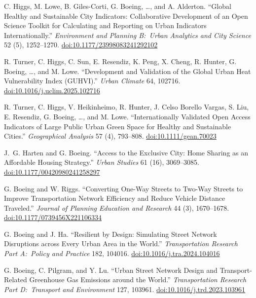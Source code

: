 \documentclass[11pt,letterpaper]{report} %
\begin{document}
\begin{tablist}
\item[2025] \tab{}C. Higgs, M. Lowe, B. Giles-Corti, G. Boeing, \ldots, and A. Alderton. \enquote{Global Healthy and Sustainable City Indicators: Collaborative Development of an Open Science Toolkit for Calculating and Reporting on Urban Indicators Internationally.} \textit{Environment and Planning B:\ Urban Analytics and City Science} 52 (5), 1252--1270. \href{https://doi.org/10.1177/23998083241292102}{doi:10.1177/23998083241292102}

\item[2025] \tab{}R. Turner, C. Higgs, C. Sun, E. Resendiz, K. Peng, X. Cheng, R. Hunter, G. Boeing, \ldots, and M. Lowe. \enquote{Development and Validation of the Global Urban Heat Vulnerability Index (GUHVI).} \textit{Urban Climate} 64, 102716. \href{https://doi.org/10.1016/j.uclim.2025.102716}{doi:10.1016/j.uclim.2025.102716}

\item[2025] \tab{}R. Turner, C. Higgs, V. Heikinheimo, R. Hunter, J. Celso Borello Vargas, S. Liu, E. Resendiz, G. Boeing, \ldots, and M. Lowe. \enquote{Internationally Validated Open Access Indicators of Large Public Urban Green Space for Healthy and Sustainable Cities.} \textit{Geographical Analysis} 57 (4), 793--808. \href{https://doi.org/10.1111/gean.70023}{doi:10.1111/gean.70023}

\item[2024] \tab{}J.~G. Harten and G. Boeing. \enquote{Access to the Exclusive City: Home Sharing as an Affordable Housing Strategy.} \textit{Urban Studies} 61 (16), 3069--3085. \href{https://doi.org/10.1177/00420980241258297}{doi:10.1177/00420980241258297}

\item[2024] \tab{}G. Boeing and W. Riggs. \enquote{Converting One-Way Streets to Two-Way Streets to Improve Transportation Network Efficiency and Reduce Vehicle Distance Traveled.} \textit{Journal of Planning Education and Research} 44 (3), 1670--1678. \href{https://doi.org/10.1177/0739456X221106334}{doi:10.1177/0739456X221106334}

\item[2024] \tab{}G. Boeing and J. Ha. \enquote{Resilient by Design: Simulating Street Network Disruptions across Every Urban Area in the World.} \textit{Transportation Research Part A:\ Policy and Practice} 182, 104016. \href{https://doi.org/10.1016/j.tra.2024.104016}{doi:10.1016/j.tra.2024.104016}

\item[2024] \tab{}G. Boeing, C. Pilgram, and Y. Lu. \enquote{Urban Street Network Design and Transport-Related Greenhouse Gas Emissions around the World.} \textit{Transportation Research Part D:\ Transport and Environment} 127, 103961. \href{https://doi.org/10.1016/j.trd.2023.103961}{doi:10.1016/j.trd.2023.103961}


\end{tablist}
\end{document}
